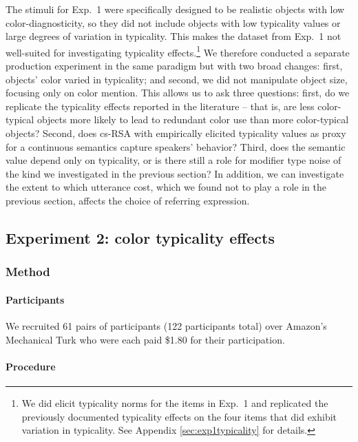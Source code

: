 \documentclass[11pt]{article}
\newcommand{\appref}[1]{Appendix \ref{#1}}
\begin{document}
The stimuli for Exp.~1 were specifically designed to be realistic objects with low color-diagnosticity, so they did not include objects with low typicality values or large degrees of variation in typicality. This makes the dataset from Exp.~1 not well-suited for investigating typicality effects.\footnote{We did elicit typicality norms for the items in Exp.~1 and replicated the previously documented typicality effects on the four items that did exhibit variation in typicality. See \appref{sec:exp1typicality} for details.} We therefore conducted a separate production experiment in the same paradigm but with two broad changes: first, objects' color varied in typicality; and second, we did not manipulate object size, focusing only on color mention. This allows us to ask three questions: first, do we replicate the typicality effects reported in the literature -- that is, are less color-typical objects more likely to lead to redundant color use than more color-typical objects? Second, does cs-RSA with empirically elicited typicality values as proxy for a continuous semantics capture speakers' behavior? Third, does the semantic value depend only on typicality, or is there still a role for modifier type noise of the kind we investigated in the previous section? In addition, we can investigate the extent to which utterance cost, which we found not to play a role in the previous section, affects the choice of referring expression.


\subsection{Experiment 2: color typicality effects}
\label{sec:modifiertypicalityeffects}



\subsubsection{Method}

\paragraph{Participants}
We recruited 61 pairs of participants (122 participants total) over Amazon's Mechanical Turk who were each paid \$1.80 for their participation. 


\paragraph{Procedure}
\end{document}
